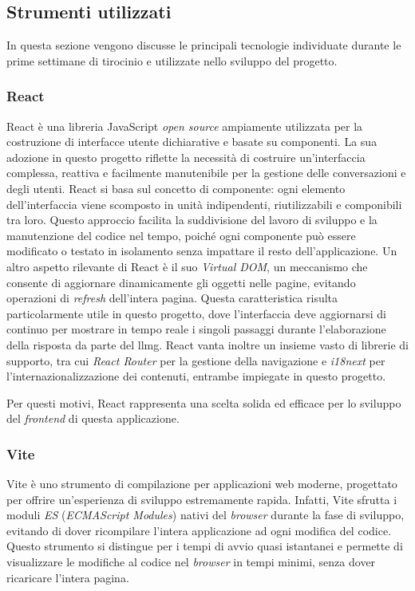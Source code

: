 \subsection{Strumenti utilizzati}
In questa sezione vengono discusse le principali tecnologie 
individuate durante le prime settimane di tirocinio e
utilizzate nello sviluppo del progetto.

\subsubsection{React}

React è una libreria JavaScript \textit{open source} ampiamente utilizzata per la costruzione di interfacce utente dichiarative e basate su componenti. 
La sua adozione in questo progetto riflette la necessità di costruire un'interfaccia complessa, reattiva e facilmente manutenibile per la gestione delle conversazioni e degli utenti.
React si basa sul concetto di componente: ogni elemento dell'interfaccia viene scomposto in unità indipendenti, riutilizzabili e componibili tra loro. 
Questo approccio facilita la suddivisione del lavoro di sviluppo e la manutenzione del codice nel tempo, poiché ogni componente può essere modificato o testato in isolamento 
senza impattare il resto dell'applicazione.
Un altro aspetto rilevante di React è il suo \textit{Virtual DOM}, un meccanismo che consente di aggiornare dinamicamente gli oggetti nelle pagine, 
evitando operazioni di \textit{refresh} dell'intera pagina. Questa caratteristica risulta particolarmente utile in questo progetto, 
dove l'interfaccia deve aggiornarsi di continuo per mostrare in tempo reale i singoli passaggi durante l'elaborazione della risposta 
da parte del \gls{llmg}.
React vanta inoltre un insieme vasto di librerie di supporto, tra cui \textit{React Router} per la gestione della navigazione e \textit{i18next} per l'internazionalizzazione 
dei contenuti, entrambe impiegate in questo progetto. 

Per questi motivi, React rappresenta una scelta solida ed efficace per lo sviluppo del \textit{frontend} di questa applicazione.

\subsubsection{Vite}
Vite è uno strumento di compilazione per applicazioni web moderne, progettato per offrire un'esperienza di sviluppo estremamente rapida. 
Infatti, Vite sfrutta i moduli \textit{ES} (\textit{ECMAScript Modules}) nativi del \textit{browser} durante la fase di sviluppo, 
evitando di dover ricompilare l'intera applicazione ad ogni modifica del codice.
Questo strumento si distingue per i tempi di avvio quasi istantanei 
e permette di visualizzare le modifiche al codice 
nel \textit{browser} in tempi minimi, senza dover ricaricare l'intera pagina.

